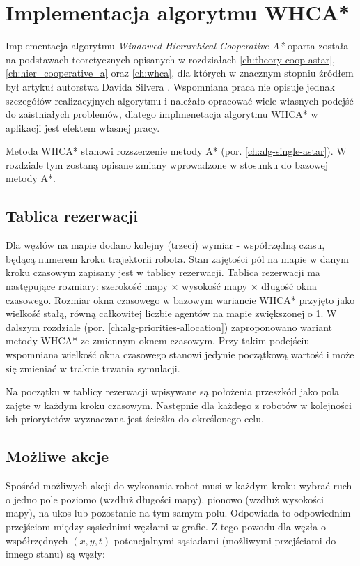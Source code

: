 \section{Implementacja algorytmu WHCA*}
\label{ch:alg-whca}

Implementacja algorytmu {\it  Windowed Hierarchical Cooperative A*} oparta została na podstawach teoretycznych opisanych w rozdziałach \ref{ch:theory-coop-astar}, \ref{ch:hier_cooperative_a} oraz \ref{ch:whca}, dla których w znacznym stopniu źródłem był artykuł autorstwa Davida Silvera \cite{cooppath}.
Wspomniana praca nie opisuje jednak szczegółów realizacyjnych algorytmu i należało opracować wiele własnych podejść do zaistniałych problemów, dlatego implmenetacja algorytmu WHCA* w aplikacji jest efektem własnej pracy.

Metoda WHCA* stanowi rozszerzenie metody A* (por. \ref{ch:alg-single-astar}). W rozdziale tym zostaną opisane zmiany wprowadzone w stosunku do bazowej metody A*.

\subsection{Tablica rezerwacji}
Dla węzłów na mapie dodano kolejny (trzeci) wymiar - współrzędną czasu, będącą numerem kroku trajektorii robota.
Stan zajętości pól na mapie w danym kroku czasowym zapisany jest w tablicy rezerwacji.
Tablica rezerwacji ma następujące rozmiary: szerokość mapy $\times$ wysokość mapy $\times$ długość okna czasowego.
Rozmiar okna czasowego w bazowym wariancie WHCA* przyjęto jako wielkość stałą, równą całkowitej liczbie agentów na mapie zwiększonej o 1.
W dalszym rozdziale (por. \ref{ch:alg-priorities-allocation}) zaproponowano wariant metody WHCA* ze zmiennym oknem czasowym. Przy takim podejściu wspomniana wielkość okna czasowego stanowi jedynie początkową wartość i może się zmieniać w trakcie trwania symulacji.

Na początku w tablicy rezerwacji wpisywane są położenia przeszkód jako pola zajęte w każdym kroku czasowym.
Następnie dla każdego z robotów w kolejności ich priorytetów wyznaczana jest ścieżka do określonego celu.

\subsection{Możliwe akcje}
Spośród możliwych akcji do wykonania robot musi w każdym kroku wybrać ruch o jedno pole poziomo (wzdłuż długości mapy), pionowo (wzdłuż wysokości mapy), na ukos lub pozostanie na tym samym polu.
Odpowiada to odpowiednim przejściom między sąsiednimi węzłami w grafie.
Z tego powodu dla węzła o współrzędnych $(x, y, t)$ potencjalnymi sąsiadami (możliwymi przejściami do innego stanu) są węzły:

